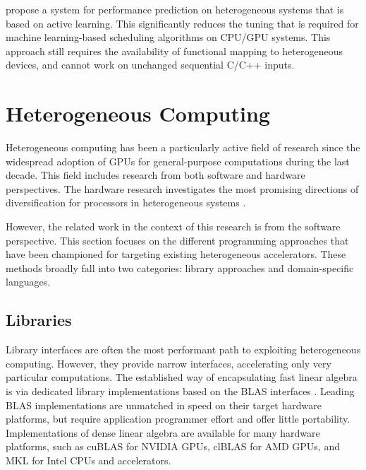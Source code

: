     \citet{Ogilvie:2014:ALA:2628071.2628128} propose a system for performance
    prediction on heterogeneous systems that is based on active learning.
    This significantly reduces the tuning that is required for
    machine learning-based scheduling algorithms on CPU/GPU systems.
    This approach still requires the availability of functional mapping
    to heterogeneous devices, and cannot work on unchanged sequential C/C++
    inputs.

\section{Heterogeneous Computing}

    Heterogeneous computing has been a particularly active field of research
    since the widespread adoption of GPUs for general-purpose computations
    during the last decade.
    This field includes research from both software and hardware perspectives.
    The hardware research investigates the most promising directions of
    diversification for processors in heterogeneous systems
    \citep{Tomusk:2016:SHC:3012405.3014165}.

    However, the related work in the context of this research is from
    the software perspective.
    This section focuses on the different programming approaches that
    have been championed for targeting existing heterogeneous accelerators.
    These methods broadly fall into two categories: library approaches and
    domain-specific languages.

\subsection{Libraries}

    Library interfaces are often the most performant path to exploiting
    heterogeneous computing.
    However, they provide narrow interfaces, accelerating only very particular
    computations.
    The established way of encapsulating fast linear algebra is via dedicated
    library implementations based on the BLAS interfaces
    \cite{2002:USB:567806.567807}.
    Leading BLAS implementations are unmatched in speed on their
    target hardware platforms, but require application programmer effort and
    offer little portability.
    Implementations of dense linear algebra are available for many
    hardware platforms, such as cuBLAS \cite{cublas} for NVIDIA GPUs, clBLAS
    \cite{clblas} for AMD GPUs, and MKL \cite{mkl} for Intel
    CPUs and accelerators.

